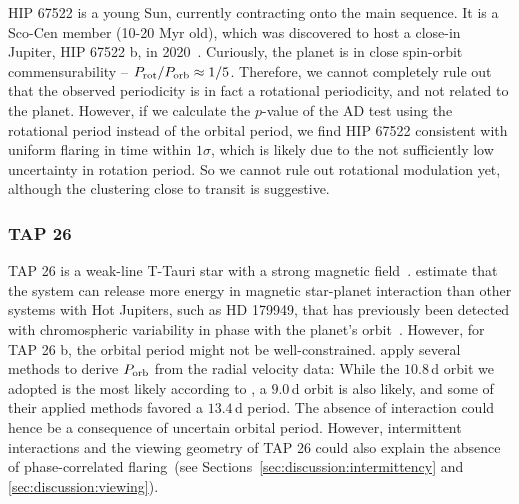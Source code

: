 \documentclass[twocolumn]{aastex631}
\begin{document}
HIP 67522 is a young Sun, currently contracting onto the main sequence. It is a Sco-Cen member (10-20 Myr old), which was discovered to host a close-in Jupiter, HIP 67522 b, in 2020~\citep{rizzuto2020tess}. Curiously, the planet is in close spin-orbit commensurability -- $P_{\rm rot}/P_{\rm orb}\approx 1/5$. Therefore, we cannot completely rule out that the observed periodicity is in fact a rotational periodicity, and not related to the planet. However, if we calculate the $p$-value of the AD test using the rotational period instead of the orbital period, we find HIP 67522 consistent with uniform flaring in time within $1\sigma$, which is likely due to the not sufficiently low uncertainty in rotation period. So we cannot rule out rotational modulation yet, although the clustering close to transit is suggestive.%


\subsubsection{TAP 26}
\label{sec:results:individualstars:tap26}
TAP 26 is a weak-line T-Tauri star with a strong magnetic field~\citep{yu2017hot}. \citet{lanza2018closeby} estimate that the system can release more energy in magnetic star-planet interaction than other  systems with Hot Jupiters, such as HD 179949, that has previously been detected with chromospheric variability in phase with the planet's orbit~\citep{shkolnik2008nature}. However, for TAP 26 b, the orbital period might not be well-constrained. \citet{yu2017hot} apply several methods to derive $P_{\rm orb}$ from the radial velocity data: While the $10.8\,$d orbit we adopted is the most likely according to \citet{yu2017hot}, a $9.0\,$d orbit is also likely, and some of their applied methods favored a $13.4\,$d period. The absence of interaction could hence be a consequence of uncertain orbital period. However, intermittent interactions and the viewing geometry of TAP 26 could also explain the absence of phase-correlated flaring~(see Sections~\ref{sec:discussion:intermittency} and \ref{sec:discussion:viewing}).
\end{document}
